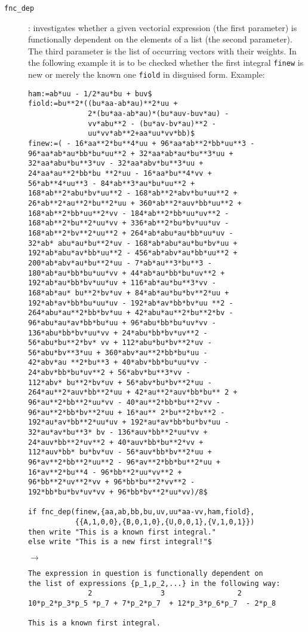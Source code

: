 \begin{description}
\item[\texttt{fnc\_dep}] : investigates whether a given vectorial
  expression (the first parameter) is functionally dependent on the
  elements of a list (the second parameter).  The third parameter is
  the list of occurring vectors with their weights.  In the following
  example it is to be checked whether the first integral
  \texttt{finew} is new or merely the known one \texttt{fiold} in
  disguised form.  Example:
{\small\begin{verbatim}
ham:=ab*uu - 1/2*au*bu + buv$
fiold:=bu**2*((bu*aa-ab*au)**2*uu +
              2*(bu*aa-ab*au)*(bu*auv-buv*au) -
              vv*abu**2 - (bu*av-bv*au)**2 -
              uu*vv*ab**2+aa*uu*vv*bb)$
finew:=( - 16*aa**2*bu**4*uu + 96*aa*ab**2*bb*uu**3 -
96*aa*ab*au*bb*bu*uu**2 + 32*aa*ab*au*bu**3*uu +
32*aa*abu*bu**3*uv - 32*aa*abv*bu**3*uu +
24*aa*au**2*bb*bu **2*uu - 16*aa*bu**4*vv +
56*ab**4*uu**3 - 84*ab**3*au*bu*uu**2 +
168*ab**2*abu*bv*uu**2 - 168*ab**2*abv*bu*uu**2 +
26*ab**2*au**2*bu**2*uu + 360*ab**2*auv*bb*uu**2 +
168*ab**2*bb*uu**2*vv - 184*ab**2*bb*uu*uv**2 -
168*ab**2*bu**2*uu*vv + 336*ab**2*bu*bv*uu*uv -
168*ab**2*bv**2*uu**2 + 264*ab*abu*au*bb*uu*uv -
32*ab* abu*au*bu**2*uv - 168*ab*abu*au*bu*bv*uu +
192*ab*abu*av*bb*uu**2 - 456*ab*abv*au*bb*uu**2 +
200*ab*abv*au*bu**2*uu - 7*ab*au**3*bu**3 -
180*ab*au*bb*bu*uu*vv + 44*ab*au*bb*bu*uv**2 +
192*ab*au*bb*bv*uu*uv + 116*ab*au*bu**3*vv -
168*ab*au* bu**2*bv*uv + 84*ab*au*bu*bv**2*uu +
192*ab*av*bb*bu*uu*uv - 192*ab*av*bb*bv*uu **2 -
264*abu*au**2*bb*bv*uu + 42*abu*au**2*bu**2*bv -
96*abu*au*av*bb*bu*uu + 96*abu*bb*bu*uv*vv -
136*abu*bb*bv*uu*vv + 24*abu*bb*bv*uv**2 -
56*abu*bu**2*bv* vv + 112*abu*bu*bv**2*uv -
56*abu*bv**3*uu + 360*abv*au**2*bb*bu*uu -
42*abv*au **2*bu**3 + 40*abv*bb*bu*uu*vv -
24*abv*bb*bu*uv**2 + 56*abv*bu**3*vv -
112*abv* bu**2*bv*uv + 56*abv*bu*bv**2*uu -
264*au**2*auv*bb**2*uu + 42*au**2*auv*bb*bu** 2 +
96*au**2*bb**2*uu*vv - 40*au**2*bb*bu**2*vv -
96*au**2*bb*bv**2*uu + 16*au** 2*bu**2*bv**2 -
192*au*av*bb**2*uu*uv + 192*au*av*bb*bu*bv*uu -
32*au*av*bu**3* bv - 136*auv*bb**2*uu*vv +
24*auv*bb**2*uv**2 + 40*auv*bb*bu**2*vv +
112*auv*bb* bu*bv*uv - 56*auv*bb*bv**2*uu +
96*av**2*bb**2*uu**2 - 96*av**2*bb*bu**2*uu +
16*av**2*bu**4 - 96*bb**2*uu*vv**2 +
96*bb**2*uv**2*vv + 96*bb*bu**2*vv**2 -
192*bb*bu*bv*uv*vv + 96*bb*bv**2*uu*vv)/8$

if fnc_dep(finew,{aa,ab,bb,bu,uv,uu*aa-vv,ham,fiold},
           {{A,1,0,0},{B,0,1,0},{U,0,0,1},{V,1,0,1}})
then write "This is a known first integral."
else write "This is a new first integral!"$
\end{verbatim}}
$\longrightarrow$
{\small\begin{verbatim}
The expression in question is functionally dependent on
the list of expressions {p_1,p_2,...} in the following way:
              2                3                 2
10*p_2*p_3*p_5 *p_7 + 7*p_2*p_7  + 12*p_3*p_6*p_7  - 2*p_8

This is a known first integral.
\end{verbatim}}
\end{description}

